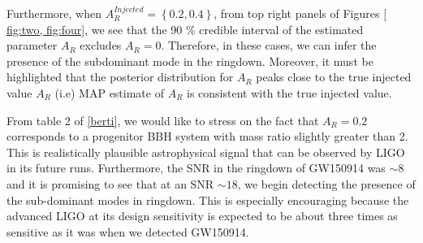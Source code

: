 Furthermore, when $A_{R}^{Injected} = \left\lbrace 0.2, 0.4 \right\rbrace $, from top right panels of Figures \ref{ fig:two, fig:four}, we see that the 90 \% credible interval of the estimated parameter $A_{R}$ excludes $A_{R} =0 $. Therefore, in these cases, we can infer the presence of the subdominant mode in the ringdown. Moreover, it must be highlighted that the posterior distribution for $A_{R}$ peaks close to the true injected value $A_{R} $ (i.e) MAP estimate of $A_{R}$ is consistent with the true injected value.   

From table 2 of \ref{berti}, we would like to stress on the fact that $A_{R} =0.2 $ corresponds to a progenitor BBH system with mass ratio slightly greater than 2. This is realistically plausible astrophysical signal that can be observed by LIGO in its future runs. Furthermore, the SNR in the ringdown of GW150914 was $\sim 8$ and it is promising to see that at an SNR $\sim 18$, we begin detecting the presence of the sub-dominant modes in ringdown. This is especially encouraging because the advanced LIGO at its design sensitivity is expected to be about three times as sensitive as it was when we detected GW150914. 

  


